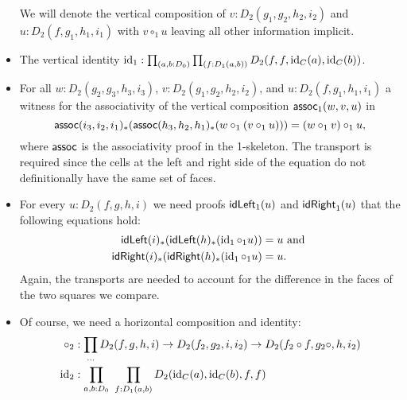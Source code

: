 \begin{defn}
\begin{itemize}
We will denote the vertical composition of $v : D_2(g_1, g_2, h_2, i_2)$ and
$u: D_2(f, g_1, h_1, i_1)$ with $v \circ_1 u$ leaving all other information implicit.
\item The vertical identity $\operatorname{id}_1 : \prod_{(a,b:D_0)} \prod_{(f : D_1(a,b))}
D_2(f,f,\operatorname{id}_C(a),\operatorname{id}_C(b))$.
\item For all $w : D_2(g_2,g_3,h_3,i_3)$, $v : D_2(g_1,g_2,h_2,i_2)$,
and $u : D_2(f,g_1,h_1,i_1)$ a witness for the associativity of the vertical
composition $\mathsf{assoc}_1(w, v, u)$ in %
\begin{equation*}
\mathsf{assoc}(i_3,i_2,i_1)_*(\mathsf{assoc}(h_3,h_2,h_1)_*(w \circ_1 (v \circ_1 u))) =
(w \circ_1 v) \circ_1 u \text{,}
\end{equation*}
where $\mathsf{assoc}$ is the associativity proof in the 1-skeleton.
The transport is required since the cells at the left and right side of the equation
do not definitionally have the same set of faces.
\item For every $u : D_2(f, g, h, i)$ we need proofs $\mathsf{idLeft}_1(u)$ and $\mathsf{idRight}_1(u)$
that the following equations hold:
\begin{align*}
\mathsf{idLeft}(i)_*(\mathsf{idLeft}(h)_*(\operatorname{id}_1 \circ_1 u)) &= u \text{ and } \\
\mathsf{idRight}(i)_*(\mathsf{idRight}(h)_*(\operatorname{id}_1 \circ_1 u) &= u \text{.}
\end{align*}
Again, the transports are needed to account for the difference in the faces
of the two squares we compare.
\item Of course, we need a horizontal composition and identity:
\begin{align*}
\circ_2 &: \prod_{\ldots} D_2(f,g,h,i) \to D_2(f_2,g_2,i,i_2) 
	\to D_2(f_2 \circ f,g_2\circ,h,i_2) \\
\operatorname{id}_2 &: \prod_{a,b:D_0} ~ \prod_{f : D_1(a,b)} D_2(\operatorname{id}_C(a),\operatorname{id}_C(b),f,f)
\end{align*}


\end{itemize}
\end{defn}
